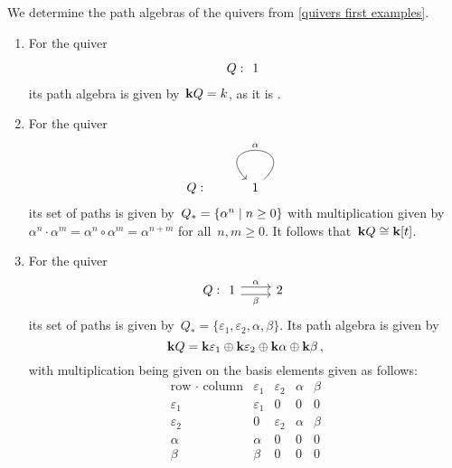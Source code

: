 \begin{example}
  We determine the path algebras of the quivers from \cref{quivers first examples}.
  \begin{enumerate}
    \item
      For the quiver
      \[
        Q :
        \begin{tikzcd}
          1
        \end{tikzcd}
      \]
      its path algebra is given by~$\mathbf{k} Q = k$, as it is .
    \item
      For the quiver
      \[
        Q :
        \begin{tikzcd}
            1
            \arrow[loop]{r}[above]{\alpha}
        \end{tikzcd}
      \]
      its set of paths is given by~$Q_* = \{ \alpha^n \suchthat n \geq 0 \}$ with multiplication given by~$\alpha^n \cdot \alpha^m = \alpha^n \circ \alpha^m = \alpha^{n+m}$ for all~$n, m \geq 0$.
      It follows that~$\mathbf{k} Q \cong \mathbf{k}[t]$.
    \item
      For the quiver
      \[
        Q :
        \begin{tikzcd}
            1
            \arrow[shift left = 0.3em]{r}[above]{\alpha}
            \arrow[shift right = 0.3em]{r}[below]{\beta}
          & 2
        \end{tikzcd}
      \]
      its set of paths is given by~$Q_* = \{ \varepsilon_1, \varepsilon_2, \alpha, \beta \}$.
      Its path algebra is given by
      \[
          \mathbf{k} Q
        = \mathbf{k} \varepsilon_1 \oplus \mathbf{k} \varepsilon_2 \oplus \mathbf{k} \alpha \oplus \mathbf{k} \beta \,,
      \]
      with multiplication being given on the basis elements given as follows:
      \[
        \begin{array}{r|cccc}
            \text{row $\cdot$ column}
          & \varepsilon_1
          & \varepsilon_2
          & \alpha
          & \beta
          \\
          \hline
            \varepsilon_1
          & \varepsilon_1
          & 0
          & 0
          & 0
          \\
            \varepsilon_2
          & 0
          & \varepsilon_2
          & \alpha
          & \beta
          \\
            \alpha
          & \alpha
          & 0
          & 0
          & 0
          \\
            \beta
          & \beta
          & 0
          & 0
          & 0
        \end{array}
      \]

  \end{enumerate}
\end{example}


